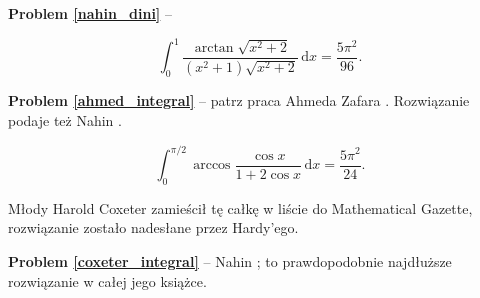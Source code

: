 \textbf{Problem \ref{nahin_dini}} -- \cite[s. 109-112]{nahin15}

\begin{problem_with_solution}
    \label{ahmed_integral}%
    \begin{equation}
        \int_0^1 \frac{\arctan \sqrt{x^2+2}}{(x^2+1) \sqrt{x^2+2}} \,\mathrm{d}x = \frac{5\pi^2}{96}.
    \end{equation}
\end{problem_with_solution}

\textbf{Problem \ref{ahmed_integral}} -- patrz praca Ahmeda Zafara \cite{ahmed02}.
Rozwiązanie podaje też Nahin \cite[s. 190-194]{nahin15}.

\begin{problem_with_solution}
    \label{coxeter_integral}%
    \begin{equation}
        \int_0^{\pi/2} \arccos \frac{\cos x}{1 + 2\cos x}  \,\mathrm{d}x = \frac{5\pi^2}{24}.
    \end{equation}
\end{problem_with_solution}

Młody Harold Coxeter zamieścił tę całkę w liście do Mathematical Gazette, rozwiązanie zostało nadesłane przez Hardy'ego.

\textbf{Problem \ref{coxeter_integral}} -- Nahin \cite[s. 190-201]{nahin15}; to prawdopodobnie najdłuższe rozwiązanie w całej jego książce.




%